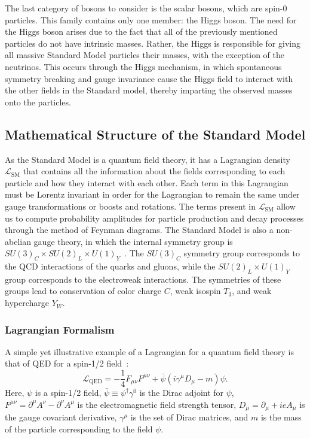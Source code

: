 The last category of bosons to consider is the scalar bosons, which are spin-0 particles.
This family contains only one member: the Higgs boson.
The need for the Higgs boson arises due to the fact that all of the previously mentioned particles do not have intrinsic masses.
Rather, the Higgs is responsible for giving all massive Standard Model particles their masses, with the exception of the neutrinos.
This occurs through the Higgs mechanism, in which spontaneous symmetry breaking and gauge invariance cause the Higgs field to interact with the other fields in the Standard model, thereby imparting the observed masses onto the particles. %

\subsection{Mathematical Structure of the Standard Model}

As the Standard Model is a quantum field theory, it has a Lagrangian density $\mathcal{L}_\mathrm{SM}$ that contains all the information about the fields corresponding to each particle and how they interact with each other.
Each term in this Lagrangian must be Lorentz invariant in order for the Lagrangian to remain the same under gauge transformations or boosts and rotations.
The terms present in $\mathcal{L}_\mathrm{SM}$ allow us to compute probability amplitudes for particle production and decay processes through the method of Feynman diagrams.
The Standard Model is also a non-abelian gauge theory, in which the internal symmetry group is $SU(3)_C\times SU(2)_L\times U(1)_Y$~\cite{Srednicki:1019751}.
The $SU(3)_C$ symmetry group corresponds to the QCD interactions of the quarks and gluons, while the $SU(2)_L\times U(1)_Y$ group corresponds to the electroweak interactions.
The symmetries of these groups lead to conservation of color charge $C$, weak isospin $T_3$, and weak hypercharge $Y_W$. %

\subsubsection{Lagrangian Formalism}

A simple yet illustrative example of a Lagrangian for a quantum field theory is that of QED for a spin-1/2 field~\cite{Klauber:2013ipa}:
\begin{equation}\label{eq:QED}
  \mathcal{L}_\mathrm{QED}=-\frac{1}{4}F_{\mu\nu}F^{\mu\nu}+\bar{\psi}(i\gamma^\mu D_\mu-m)\psi.
\end{equation}
Here, $\psi$ is a spin-1/2 field, $\bar{\psi}\equiv\psi^\dagger\gamma^0$ is the Dirac adjoint for $\psi$, $F^{\mu\nu}=\partial^\mu A^\nu-\partial^\nu A^\mu$ is the electromagnetic field strength tensor, $D_\mu=\partial_\mu+ieA_\mu$ is the gauge covariant derivative, $\gamma^\mu$ is the set of Dirac matrices, and $m$ is the mass of the particle corresponding to the field $\psi$.

